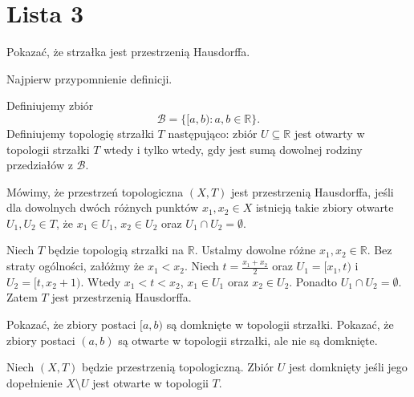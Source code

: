\chapter{Lista 3}
\begin{problem}[1]
	Pokazać, że strzałka jest przestrzenią Hausdorffa.
\end{problem} 
Najpierw przypomnienie definicji.
\begin{definition}[Strzałka.]
	Definiujemy zbiór 
	 \[
	\mathcal{B} = \{[a,b) : a,b \in \mathbb{R}\} 
	.\] 
	Definiujemy topologię strzałki $T$ następująco: zbiór $U\subseteq \mathbb{R}$ jest otwarty w topologii strzałki $T$ wtedy i tylko wtedy, gdy jest sumą dowolnej rodziny przedziałów z  $\mathcal{B}$.
\end{definition} 
\begin{definition}
	Mówimy, że przestrzeń topologiczna $\left( X,T \right) $ jest przestrzenią Hausdorffa, jeśli dla dowolnych dwóch różnych punktów $x_1, x_2 \in X$ istnieją takie zbiory otwarte $U_1, U_2 \in T$, że $x_1 \in U_1$, $x_2 \in U_2$ oraz $U_1 \cap U_2 = \emptyset$.
\end{definition} 
\begin{solution}
	Niech $T$ będzie topologią strzałki na $\mathbb{R}$. Ustalmy dowolne różne $x_1, x_2 \in \mathbb{R}$. Bez straty ogólności, załóżmy że $x_1 < x_2$. Niech $t = \tfrac{x_1+x_2}{2}$ oraz  $U_1 = [x_1,t)$ i $U_2 = [t, x_2+1)$. Wtedy $x_1 < t < x_2$, $x_1 \in U_1$ oraz $x_2 \in U_2$. Ponadto $U_1\cap U_2 = \emptyset$. Zatem $T$ jest przestrzenią Hausdorffa. 
\end{solution} 
\begin{problem}[2]
	Pokazać, że  zbiory postaci $[a,b)$ są domknięte w topologii strzałki. Pokazać, że zbiory postaci $\left( a,b \right) $ są otwarte w topologii strzałki, ale nie są domknięte.
\end{problem} 
\begin{definition}
	Niech $\left( X,T \right) $ będzie przestrzenią topologiczną. Zbiór $U$ jest domknięty jeśli jego dopełnienie $X\setminus U$ jest otwarte w topologii $T$.
\end{definition} 
